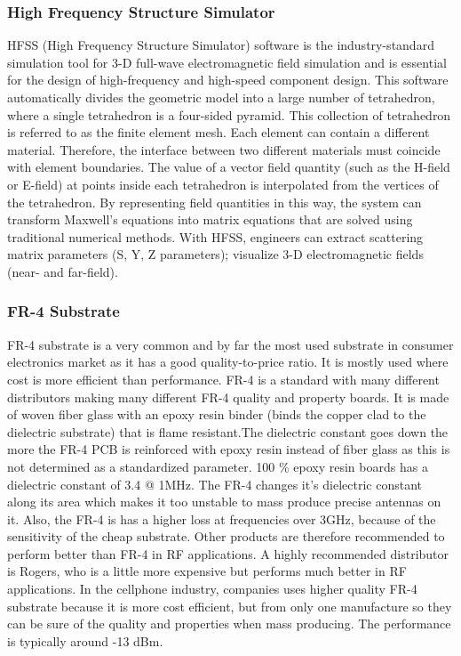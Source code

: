 \documentclass[12pt]{article}
\begin{document}
	           \subsubsection{High Frequency Structure Simulator }
	            \justify
	                HFSS (High Frequency Structure Simulator) software is the industry-standard simulation tool for 3-D full-wave electromagnetic field simulation and is essential for the design of high-frequency and high-speed component design. This software automatically divides the geometric model into a large number of tetrahedron, where a single tetrahedron is a four-sided pyramid. This collection of tetrahedron is referred to as the finite element mesh. Each element can contain a different material. Therefore, the interface between two different materials must coincide with element boundaries. The value of a vector field quantity (such as the H-field or E-field) at points inside each tetrahedron is interpolated from the vertices of the tetrahedron. By representing field quantities in this way, the system can transform Maxwell's equations into matrix equations that are solved using traditional numerical methods. With HFSS, engineers can extract scattering matrix parameters (S, Y, Z parameters); visualize 3-D electromagnetic fields (near- and far-field).

	             \subsubsection{FR-4 Substrate}
		           \justify
		            FR-4 substrate is a very common and by far the most used substrate in consumer electronics market as it has a good quality-to-price ratio. It is mostly used where cost is more efficient than performance. FR-4 is a standard with many different distributors making many different FR-4 quality and property boards. It is made of woven fiber glass with an epoxy resin binder (binds the copper clad to the dielectric substrate) that is flame resistant.The dielectric constant goes down the more the FR-4 PCB is reinforced with epoxy resin instead of fiber glass as this is not determined as a standardized parameter. 100 \% epoxy resin boards has a dielectric constant of 3.4 @ 1MHz.
		           \justify
		           	The FR-4 changes it’s dielectric constant along its area which makes it too unstable to mass produce precise antennas on it. Also, the FR-4 is has a higher loss at frequencies over 3GHz, because of the sensitivity of the cheap substrate. Other products are therefore recommended to perform better than FR-4 in RF applications. A highly recommended distributor is Rogers, who is a little more expensive but performs much better in RF applications. In the cellphone industry, companies uses higher quality FR-4 substrate because it is more cost efficient, but from only one manufacture so they can be sure of the quality and properties when mass producing. The performance is typically around -13 dBm.\\
\end{document}
